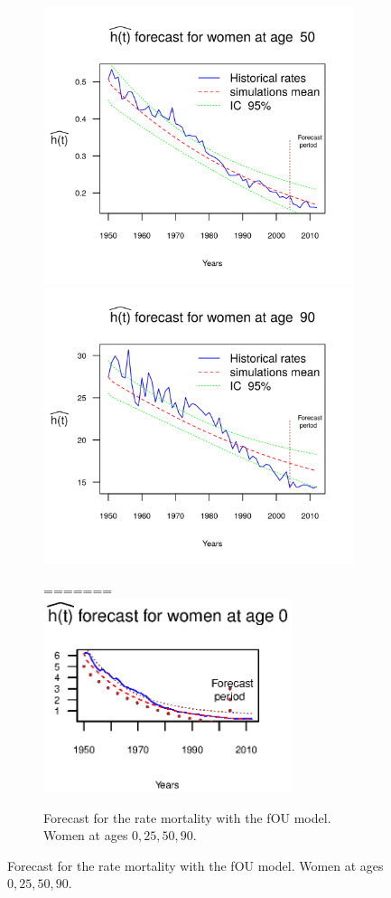 \documentclass[smallextended]{svjour3}
\begin{document}
\begin{figure}[H]
\begin{figure}[H]
    \includegraphics{PlotWomenForecast50.png}
    \includegraphics{PlotWomenForecast90.png}
    \caption{Forecast for the rate mortality with the fOU model. Women at ages
    $0,25,50,90$.}
=======
    \includegraphics[width = 2.85in]{PlotWomenForecast0.eps}

\end{figure}
\end{figure}
\end{document}
